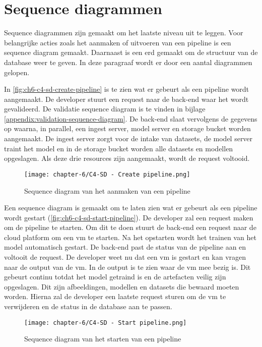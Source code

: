 \newpage

\section{Sequence diagrammen}\label{sec:ch6-sequence-diagrammen}
Sequence diagrammen zijn gemaakt om het laatste niveau uit te leggen. Voor belangrijke acties zoals het aanmaken of uitvoeren van een pipeline is een sequence diagram gemaakt. Daarnaast is een \acrshort{erd} gemaakt om de structuur van de database weer te geven. In deze paragraaf wordt er door een aantal diagrammen gelopen.

In \autoref{fig:ch6-c4-sd-create-pipeline} is te zien wat er gebeurt als een pipeline wordt aangemaakt. De developer stuurt een request naar de back-end waar het wordt gevalideerd. De validatie sequence diagram is te vinden in bijlage \ref{appendix:validation-sequence-diagram}. De back-end slaat vervolgens de gegevens op waarna, in parallel, een ingest server, model server en storage bucket worden aangemaakt. De ingest server zorgt voor de intake van datasets, de model server traint het model en in de storage bucket worden alle datasets en modellen opgeslagen. Als deze drie resources zijn aangemaakt, wordt de request voltooid.

\begin{figure}[hbt!]
  \centering
  \texttt{[image: chapter-6/C4-SD - Create pipeline.png]}
  \caption{Sequence diagram van het aanmaken van een pipeline}
  \label{fig:ch6-c4-sd-create-pipeline}
\end{figure}

\newpage

Een sequence diagram is gemaakt om te laten zien wat er gebeurt als een pipeline wordt gestart (\autoref{fig:ch6-c4-sd-start-pipeline}). De developer zal een request maken om de pipeline te starten. Om dit te doen stuurt de back-end een request naar de cloud platform om een \acrfull{vm} te starten. Na het opstarten wordt het trainen van het model automatisch gestart. De back-end past de status van de pipeline aan en voltooit de request. De developer weet nu dat een \acrshort{vm} is gestart en kan vragen naar de output van de \acrshort{vm}. In de output is te zien waar de \acrshort{vm} mee bezig is. Dit gebeurt continu totdat het model getraind is en de artefacten veilig zijn opgeslagen. Dit zijn afbeeldingen, modellen en datasets die bewaard moeten worden. Hierna zal de developer een laatste request sturen om de \acrshort{vm} te verwijderen en de status in de database aan te passen. 

\begin{figure}[hbt!]
  \centering
  \texttt{[image: chapter-6/C4-SD - Start pipeline.png]}
  \caption{Sequence diagram van het starten van een pipeline}
  \label{fig:ch6-c4-sd-start-pipeline}
\end{figure}

